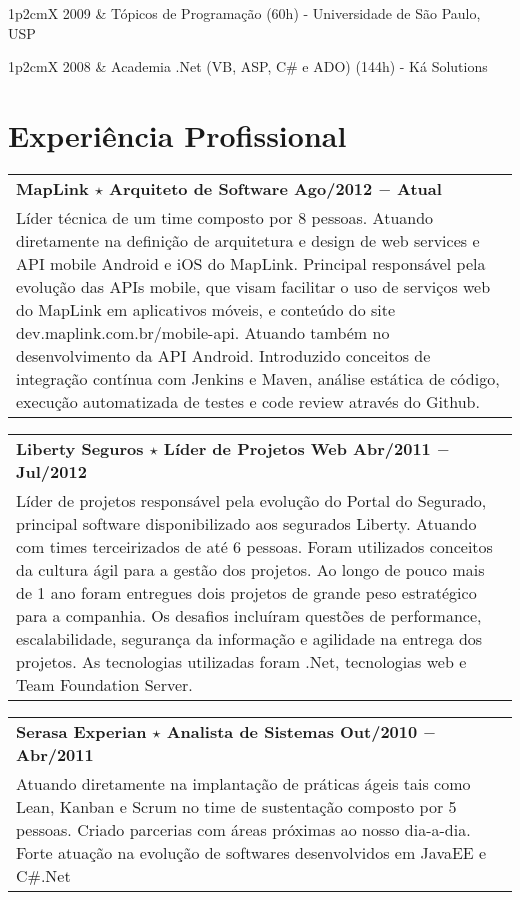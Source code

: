 \documentclass[a4paper, oneside, final]{scrartcl}
\newcommand{\vspc}{\vspace{0.15cm}} %
\newcommand{\vspcitem}{\vspace{0.1cm}} %
\begin{document}
\begin{center}
\begin{tabularx}{1\linewidth}{p{2cm}X}
2009       & Tópicos de Programação (60h) - Universidade de São Paulo, USP \vspcitem\\
\end{tabularx}

\begin{tabularx}{1\linewidth}{p{2cm}X}
2008       & Academia .Net (VB, ASP, C\# e ADO) (144h) - Ká Solutions 
\end{tabularx}

\section{Experiência Profissional}
\begin{tabularx}{1\linewidth}{X}
{\bf MapLink $\star$ Arquiteto de Software \hfill Ago/2012 $-$ Atual} \\
Líder técnica de um time composto por 8 pessoas. Atuando diretamente na definição de arquitetura e design de web services e API mobile Android e iOS do MapLink. Principal responsável pela evolução das APIs mobile, que visam facilitar o uso de serviços web do MapLink em aplicativos móveis, e conteúdo do site dev.maplink.com.br/mobile-api. Atuando também no desenvolvimento da API Android. Introduzido conceitos de integração contínua com Jenkins e Maven, análise estática de código, execução automatizada de testes e code review através do Github. \vspc\\
\end{tabularx}

\begin{tabularx}{1\linewidth}{X}
{\bf Liberty Seguros $\star$ Líder de Projetos Web \hfill Abr/2011 $-$ Jul/2012} \\
Líder de projetos responsável pela evolução do Portal do Segurado, principal software disponibilizado aos segurados Liberty. Atuando com times terceirizados de até 6 pessoas. Foram utilizados conceitos da cultura ágil para a gestão dos projetos. Ao longo de pouco mais de 1 ano foram entregues dois projetos de grande peso estratégico para a companhia. Os desafios incluíram questões de performance, escalabilidade, segurança da informação e agilidade na entrega dos projetos. As tecnologias utilizadas foram .Net, tecnologias web e Team Foundation Server.\vspc\\
\end{tabularx}

\begin{tabularx}{1\linewidth}{X}
{\bf Serasa Experian $\star$  Analista de Sistemas \hfill Out/2010 $-$ Abr/2011} \\
Atuando diretamente na implantação de práticas ágeis tais como Lean, Kanban e Scrum no time de sustentação composto por 5 pessoas. Criado parcerias com áreas próximas ao nosso dia-a-dia. Forte atuação na evolução de softwares desenvolvidos em JavaEE e C\#.Net \vspc\\
\end{tabularx}


\end{center}
\end{document}
